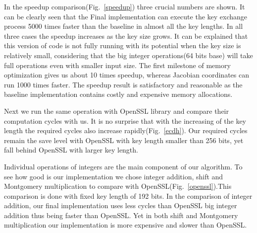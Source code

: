 In the speedup comparison(Fig.~\ref{speedup}) three crucial numbers are shown. It can be clearly seen that the Final implementation can execute the key exchange process 5000 times faster than the baseline in almost all the key lengths. In all three cases the speedup increases as the key size grows. It can be explained that this version of code is not fully running with its potential when the key size is relatively small, considering that the big integer operations(64 bits base) will take full operations even with smaller input size. The first milestone of memory optimization gives us about 10 times speedup, whereas Jacobian coordinates can run 1000 times faster. The speedup result is satisfactory and reasonable as the baseline implementation contains costly and expensive memory allocations. 



Next we run the same operation with OpenSSL library and compare their computation cycles with us. It is no surprise that with the increasing of the key length the required cycles also increase rapidly(Fig.~\ref{ecdh}). Our required cycles remain the save level with OpenSSL with key length smaller than 256 bits, yet fall behind OpenSSL with larger key length. 



Individual operations of integers are the main component of our algorithm. To see how good is our implementation we chose integer addition, shift and Montgomery multiplication to compare with OpenSSL(Fig.~\ref{openssl}).This comparison is done with fixed key length of 192 bits. In the comparison of integer addition, our final implementation uses less cycles than OpenSSL big integer addition thus being faster than OpenSSL. Yet in both shift and Montgomery multiplication our implementation is more expensive and slower than OpenSSL. 

